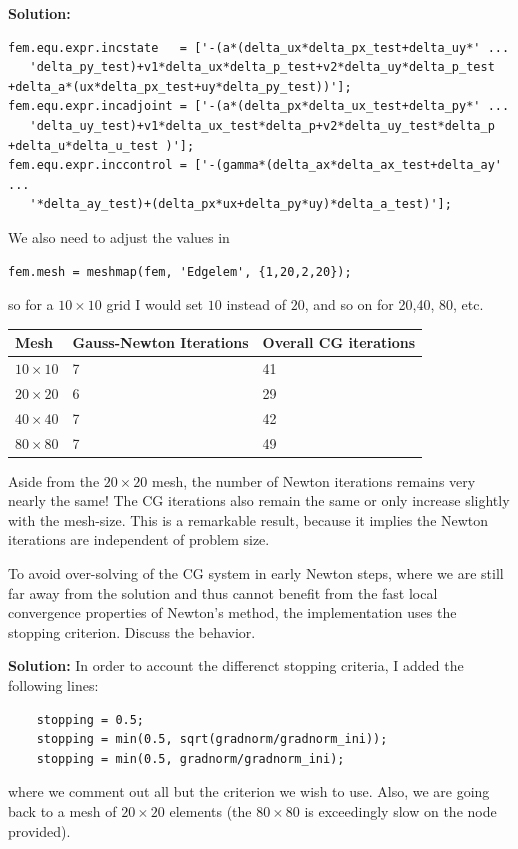 \documentclass[11pt]{article}
\newenvironment{solution}{\begin{trivlist}\item[]{\bf Solution:}}
                      {\end{trivlist}}
\begin{document}
\begin{enumerate}
\begin{solution}
\begin{lstlisting}
fem.equ.expr.incstate   = ['-(a*(delta_ux*delta_px_test+delta_uy*' ...
   'delta_py_test)+v1*delta_ux*delta_p_test+v2*delta_uy*delta_p_test
+delta_a*(ux*delta_px_test+uy*delta_py_test))'];
fem.equ.expr.incadjoint = ['-(a*(delta_px*delta_ux_test+delta_py*' ...
   'delta_uy_test)+v1*delta_ux_test*delta_p+v2*delta_uy_test*delta_p
+delta_u*delta_u_test )'];
fem.equ.expr.inccontrol = ['-(gamma*(delta_ax*delta_ax_test+delta_ay' ...
   '*delta_ay_test)+(delta_px*ux+delta_py*uy)*delta_a_test)'];
\end{lstlisting}
We also need to adjust the values in
\begin{lstlisting}
fem.mesh = meshmap(fem, 'Edgelem', {1,20,2,20});
\end{lstlisting}
so for a $10\times 10$ grid I would set $10$ instead of $20$, and so on 
 for 20,40, 80, etc. 
 
\begin{center}
\begin{tabular}{l||l|l}
 Mesh & Gauss-Newton Iterations & Overall CG iterations\\
\hline\hline
$10\times 10$ & 7 & 41\\
$20\times 20$ & 6 & 29\\
$40\times 40$ & 7 & 42\\
$80\times 80$ & 7 & 49
\end{tabular}
\end{center}

Aside from the $20\times20$ mesh, the number of Newton iterations
 remains very nearly the same! The CG iterations also remain the same or only
 increase slightly with the mesh-size. This is a remarkable result,
 because it implies the Newton iterations are independent of problem
 size. 

\end{solution}

\item[(c)]To avoid over-solving of the CG system in early Newton steps,
	  where we are still far away from the solution and thus cannot
	  benefit from the fast local convergence properties of Newton's
	  method, the implementation uses the stopping
	  criterion. Discuss the behavior.  


\begin{solution}
In order to account the differenct stopping criteria, I added the following lines:
\begin{lstlisting}
    stopping = 0.5;
    stopping = min(0.5, sqrt(gradnorm/gradnorm_ini));
    stopping = min(0.5, gradnorm/gradnorm_ini);
\end{lstlisting}
where we comment out all but the criterion we wish to use. Also, we are 
 going back to a mesh of $20\times 20$ elements (the $80\times 80$ is
 exceedingly slow on the node provided). 


\end{solution}
\end{enumerate}
\end{document}
